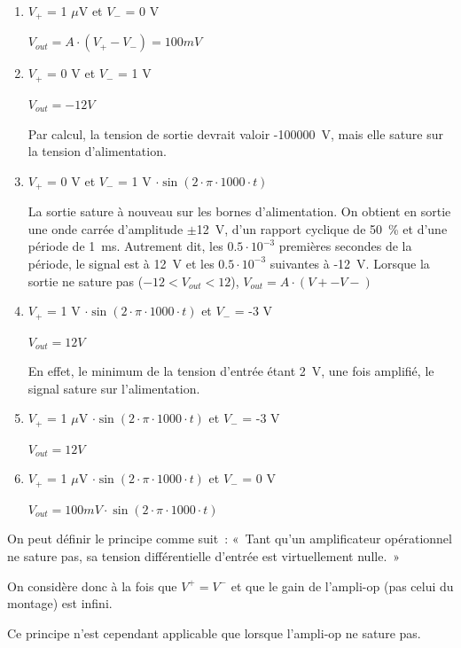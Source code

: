 \documentclass{../template/tp}
\begin{document}
{
	\begin{enumerate}[label=\alph*)]
		\item $V_+$ = 1 $\mu$V et $V_-$ = 0 V

			$V_{out} = A \cdot (V_+ - V_-) = 100 mV$

		\item $V_+$ = 0 V et $V_-$ = 1 V

			$V_{out} = -12 V$

			Par calcul, la tension de sortie devrait valoir -100000~V, mais elle sature sur la tension d'alimentation.

		\item $V_+$ = 0 V et $V_-$ = 1 V $\cdot \sin(2 \cdot \pi \cdot 1000 \cdot t)$

			La sortie sature à nouveau sur les bornes d'alimentation. On obtient en sortie une onde carrée d'amplitude $\pm$12~V, d'un rapport cyclique de 50~\% et d'une période de 1~ms. Autrement dit, les $0.5 \cdot 10^{-3}$ premières secondes de la période, le signal est à 12~V et les $0.5 \cdot 10^{-3}$ suivantes à -12~V. Lorsque la sortie ne sature pas ($-12<V_{out}<12$), $V_{out}=A\cdot\left(V+-V-\right)$

		\item $V_+$ = 1 V $\cdot \sin(2 \cdot \pi \cdot 1000 \cdot t)$ et $V_-$ = -3 V

			$V_{out} = 12 V$

			En effet, le minimum de la tension d'entrée étant 2~V, une fois amplifié, le signal sature sur l'alimentation.

		\item $V_+$ = 1 $\mu$V $\cdot \sin(2 \cdot \pi \cdot 1000 \cdot t)$ et $V_-$ = -3 V

			$V_{out} = 12 V$

		\item $V_+$ = 1 $\mu$V $\cdot \sin(2 \cdot \pi \cdot 1000 \cdot t)$ et $V_-$ = 0 V

			$V_{out} = 100 mV \cdot \sin(2 \cdot \pi \cdot 1000 \cdot t)$
	\end{enumerate}
}

{
	On peut définir le principe comme suit~: «~Tant qu'un amplificateur opérationnel ne sature pas, sa tension différentielle  d'entrée est virtuellement nulle.~»

	On considère donc à la fois que $V^+ = V^-$ et que le gain de l'ampli-op (pas celui du montage) est infini.

	Ce principe n'est cependant applicable que lorsque l'ampli-op ne sature pas.
}
\end{document}
